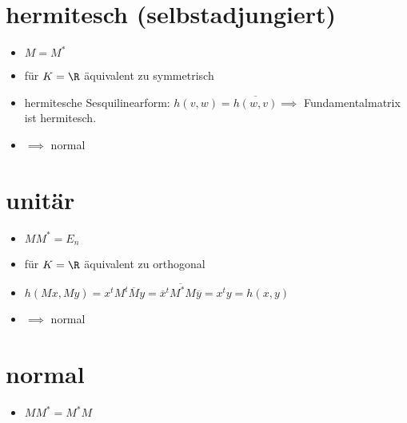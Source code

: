 \documentclass{article}
\begin{document}
\section{hermitesch (selbstadjungiert)}
\begin{itemize}
    \item $M = M^*$
    \item für $K = \R$ äquivalent zu symmetrisch
    \item hermitesche Sesquilinearform: $h(v,w) = \overline{h(w,v)} \implies $ Fundamentalmatrix ist hermitesch.
    \item $\implies$ normal
\end{itemize}
\section{unitär}
\begin{itemize}
    \item $M M^* = E_n$
    \item für $K = \R$ äquivalent zu orthogonal
    \item $h(Mx, My) = x^tM^t\overline{M}y = \overline{\overline{x}^tM^* M \overline{y}} = x^ty = h(x,y)$
    \item $\implies$ normal
\end{itemize}
\section{normal}
\begin{itemize}
    \item $M M^* = M^*M$
\end{itemize}
\end{document}
